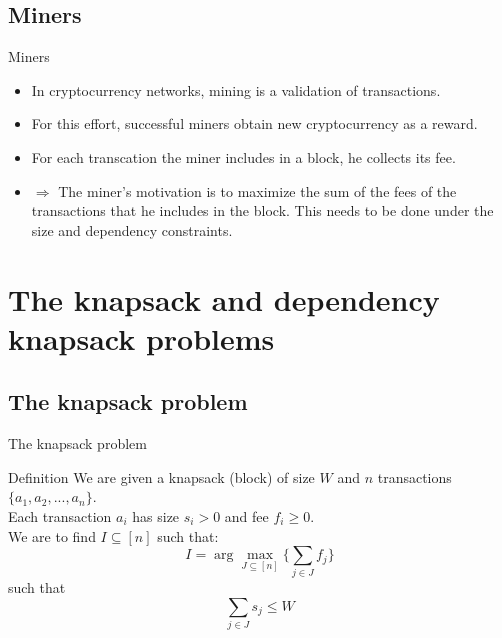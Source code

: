 \documentclass{beamer}
\begin{document}
\subsection*{Miners}

\begin{frame}{Miners}
    \begin{itemize}
        \item {In cryptocurrency networks, mining is a validation of 
        transactions.}
        \item {For this effort, successful miners obtain new cryptocurrency 
        as a reward.}
        \item {For each transcation the miner includes in a block, he 
        collects its fee.}
        \item { $\Rightarrow$ The miner's motivation is to maximize the sum of 
        the fees of the transactions that he includes in the block. This
        needs to be done under the size and dependency constraints.}
        \end{itemize}
    
\end{frame}


\section{The knapsack and dependency knapsack problems}
\subsection*{The knapsack problem}

\begin{frame}{The knapsack problem}
    \begin{block}{Definition}
    We are given a knapsack (block) of size $W$ and $n$ transactions 
    $ \{a_1,a_2,...,a_n\}$. \\ 
    Each transaction $a_i$ has size $s_i > 0$ and fee $f_i \geq 0$. \\ 
    We are to find $ I \subseteq [n] $ such that: \\
    $$ I = \arg \max_{J \subseteq[n]} \{\sum_{j\in J} f_j\} $$ such that 
    $$ \sum_{j\in J} s_j \leq W $$
    \end{block}
\end{frame}
\end{document}
